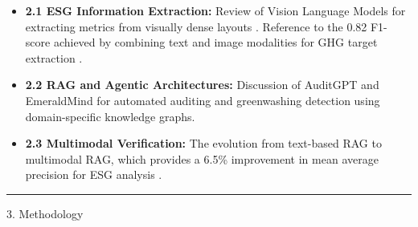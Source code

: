 \documentclass{article}
\begin{document}
\begin{itemize}
\item 

\textbf{2.1 ESG Information Extraction:} Review of Vision Language Models for extracting metrics from visually dense layouts  \parencite{tanay_gupta_aafe0c6a}. Reference to the 0.82 F1-score achieved by combining text and image modalities for GHG target extraction  \parencite{lars_wilhelmi_8d7e860b}.\item 

\textbf{2.2 RAG and Agentic Architectures:} Discussion of AuditGPT  \parencite{abhijeet_b__moghe_963e6c96} and EmeraldMind  \parencite{kaoukis__georgios_35bab107} for automated auditing and greenwashing detection using domain-specific knowledge graphs.\item 

\textbf{2.3 Multimodal Verification:} The evolution from text-based RAG to multimodal RAG, which provides a 6.5\% improvement in mean average precision for ESG analysis  \parencite{g_saipooja_m_n_488bfdd6}.
\end{itemize}
\begin{center}\rule{\linewidth}{0.5pt}\end{center}
3. Methodology
\end{document}
